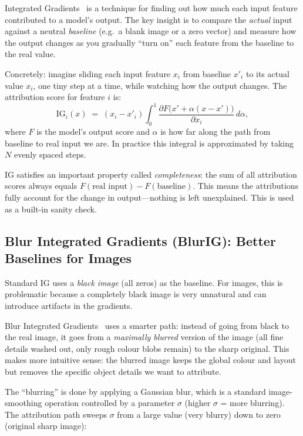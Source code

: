 \documentclass[11pt,a4paper]{article}
\begin{document}
Integrated Gradients~\cite{Sundararajan2017IntegratedGradients} is a technique
for finding out how much each input feature contributed to a model's output.
The key insight is to compare the \emph{actual} input against a neutral
\emph{baseline} (e.g.\ a blank image or a zero vector) and measure how the
output changes as you gradually ``turn on'' each feature from the baseline
to the real value.

Concretely: imagine sliding each input feature $x_i$ from baseline $x'_i$ to
its actual value $x_i$, one tiny step at a time, while watching how the output
changes. The attribution score for feature $i$ is:
\begin{equation}
    \mathrm{IG}_i(x)
    \;=\;
    (x_i - x'_i)
    \int_0^1
    \frac{\partial F\!\bigl(x' + \alpha(x - x')\bigr)}{\partial x_i}
    \,d\alpha,
    \label{eq:ig}
\end{equation}
where $F$ is the model's output score and $\alpha$ is how far along the path
from baseline to real input we are. In practice this integral is approximated
by taking $N$ evenly spaced steps.

IG satisfies an important property called \emph{completeness}: the sum of all
attribution scores always equals $F(\text{real input}) - F(\text{baseline})$.
This means the attributions fully account for the change in output---nothing is
left unexplained. This is used as a built-in sanity check.

\subsection{Blur Integrated Gradients (BlurIG): Better Baselines for Images}

Standard IG uses a \emph{black image} (all zeros) as the baseline. For images,
this is problematic because a completely black image is very unnatural and can
introduce artifacts in the gradients.

Blur Integrated Gradients~\cite{Xu2020BlurIG} uses a smarter path: instead of
going from black to the real image, it goes from a \emph{maximally blurred}
version of the image (all fine details washed out, only rough colour blobs
remain) to the sharp original. This makes more intuitive sense: the blurred
image keeps the global colour and layout but removes the specific object details
we want to attribute.

The ``blurring'' is done by applying a Gaussian blur, which is a standard
image-smoothing operation controlled by a parameter $\sigma$ (higher $\sigma$
= more blurring). The attribution path sweeps $\sigma$ from a large value
(very blurry) down to zero (original sharp image):
\end{document}
